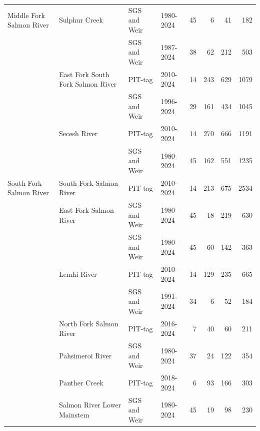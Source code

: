 \documentclass[12pt,a4paper]{article}
\begin{document}
\begin{table}
\begin{tabular}[t]{llllrrrr}
\multirow[t]{-11}{*}[8\dimexpr\aboverulesep+\belowrulesep+\cmidrulewidth]{\raggedright\arraybackslash Middle Fork Salmon River} & Sulphur Creek & SGS and Weir & 1980-2024 & 45 & 6 & 41 & 182\\

 &  & SGS and Weir & 1987-2024 & 38 & 62 & 212 & 503\\

 & \multirow[t]{-2}{*}{\raggedright\arraybackslash East Fork South Fork Salmon River} & PIT-tag & 2010-2024 & 14 & 243 & 629 & 1079\\

 &  & SGS and Weir & 1996-2024 & 29 & 161 & 434 & 1045\\

 & \multirow[t]{-2}{*}{\raggedright\arraybackslash Secesh River} & PIT-tag & 2010-2024 & 14 & 270 & 666 & 1191\\

 &  & SGS and Weir & 1980-2024 & 45 & 162 & 551 & 1235\\

\multirow[t]{-6}{*}[2\dimexpr\aboverulesep+\belowrulesep+\cmidrulewidth]{\raggedright\arraybackslash South Fork Salmon River} & \multirow[t]{-2}{*}{\raggedright\arraybackslash South Fork Salmon River} & PIT-tag & 2010-2024 & 14 & 213 & 675 & 2534\\

 & East Fork Salmon River & SGS and Weir & 1980-2024 & 45 & 18 & 219 & 630\\

 &  & SGS and Weir & 1980-2024 & 45 & 60 & 142 & 363\\

 & \multirow[t]{-2}{*}{\raggedright\arraybackslash Lemhi River} & PIT-tag & 2010-2024 & 14 & 129 & 235 & 665\\

 &  & SGS and Weir & 1991-2024 & 34 & 6 & 52 & 184\\

 & \multirow[t]{-2}{*}{\raggedright\arraybackslash North Fork Salmon River} & PIT-tag & 2016-2024 & 7 & 40 & 60 & 211\\

 & Pahsimeroi River & SGS and Weir & 1980-2024 & 37 & 24 & 122 & 354\\

 & Panther Creek & PIT-tag & 2018-2024 & 6 & 93 & 166 & 303\\

 & Salmon River Lower Mainstem & SGS and Weir & 1980-2024 & 45 & 19 & 98 & 230\\


\end{tabular}
\end{table}
\end{document}
